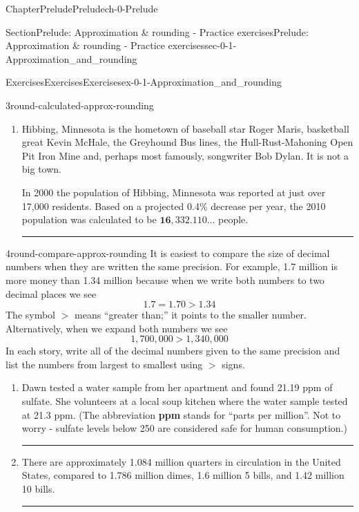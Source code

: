 \documentclass[twoside,11pt,]{book}
\newcommand{\terminology}[1]{\textbf{#1}}
\newlength{\workspacestrutwidth}
\numberwithin{equation}{section}
\begin{document}
\begin{chapterptx}{Chapter}{Prelude}{}{Prelude}{}{}{ch-0-Prelude}
\begin{sectionptx}{Section}{Prelude: Approximation \& rounding - Practice exercises}{}{Prelude: Approximation \& rounding - Practice exercises}{}{}{sec-0-1-Approximation_and_rounding}
\begin{exercises-subsection-numberless}{Exercises}{Exercises}{}{Exercises}{}{}{ex-0-1-Approximation_and_rounding}
\begin{divisionexercise}{3}{}{}{round-calculated-approx-rounding}
\begin{enumerate}[label=(\alph*),ref=\alph*]
\par\rule{\workspacestrutwidth}{1.5in}%
\item{}Hibbing, Minnesota is the hometown of baseball star Roger Maris, basketball great Kevin McHale, the Greyhound Bus lines, the Hull-Rust-Mahoning Open Pit Iron Mine and, perhaps most famously, songwriter Bob Dylan. It is not a big town.%
\par
In 2000 the population of Hibbing, Minnesota was reported at just over 17,000 residents. Based on a projected 0.4\% decrease per year, the 2010 population was calculated to be \(\mathbf{16{,}332.110\ldots}\) people.%
\par\rule{\workspacestrutwidth}{1.5in}%
\end{enumerate}%
\end{divisionexercise}%
\clearpage
\begin{divisionexercise}{4}{}{}{round-compare-approx-rounding}%
It is easiest to compare the size of decimal numbers when they are written the same precision. For example, \textdollar{}1.7 million is more money than \textdollar{}1.34 million because when we write both numbers to two decimal places we see%
\begin{equation*}
1.7 = 1.70 > 1.34
\end{equation*}
The symbol \(>\) means ``greater than;'' it points to the smaller number. Alternatively, when we expand both numbers we see%
\begin{equation*}
1{,}700{,}000  > 1{,}340{,}000
\end{equation*}
In each story, write all of the decimal numbers given to the same precision and list the numbers from largest to smallest using \(>\) signs.%
\begin{enumerate}[label=(\alph*),ref=\alph*]%
\item{}Dawn tested a water sample from her apartment and found 21.19 ppm of sulfate. She volunteers at a local soup kitchen where the water sample tested at 21.3 ppm. (The abbreviation \terminology{ppm} stands for ``parts per million''. Not to worry - sulfate levels below 250 are considered safe for human consumption.)%
\par\rule{\workspacestrutwidth}{2.3in}%
\item\label{currency-approx-rounding}There are approximately 1.084 million quarters in circulation in the United States, compared to 1.786 million dimes, 1.6 million \textdollar{}5 bills, and 1.42 million \textdollar{}10 bills.%
\par\rule{\workspacestrutwidth}{2.3in}%

\end{enumerate}
\end{divisionexercise}
\end{exercises-subsection-numberless}
\end{sectionptx}
\end{chapterptx}
\end{document}
